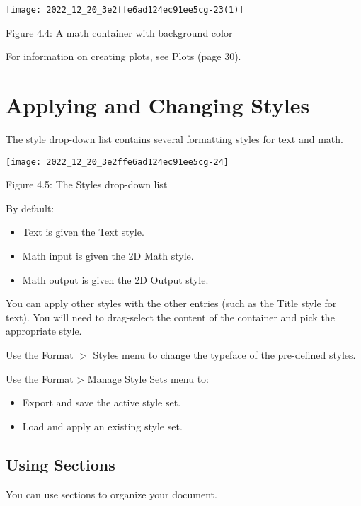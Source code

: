 \begin{center}
\texttt{[image: 2022\_12\_20\_3e2ffe6ad124ec91ee5cg-23(1)]}
\end{center}

Figure 4.4: A math container with background color

For information on creating plots, see Plots (page 30).

\section{Applying and Changing Styles}
The style drop-down list contains several formatting styles for text and math.

\begin{center}
\texttt{[image: 2022\_12\_20\_3e2ffe6ad124ec91ee5cg-24]}
\end{center}

Figure 4.5: The Styles drop-down list

By default:

\begin{itemize}
  \item Text is given the Text style.

  \item Math input is given the 2D Math style.

  \item Math output is given the 2D Output style.

\end{itemize}

You can apply other styles with the other entries (such as the Title style for text). You will need to drag-select the content of the container and pick the appropriate style.

Use the Format $>$ Styles menu to change the typeface of the pre-defined styles.

Use the Format > Manage Style Sets menu to:

\begin{itemize}
  \item Export and save the active style set.

  \item Load and apply an existing style set.

\end{itemize}

\subsection{Using Sections}
You can use sections to organize your document.

